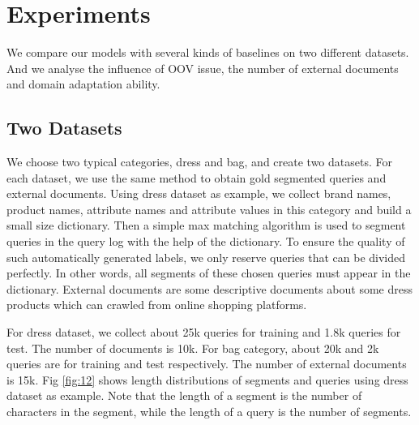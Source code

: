 \section{Experiments}
\label{sec:exp}
We compare our models with several kinds of baselines on two different datasets. And we analyse the influence of OOV issue, the number of external documents and domain adaptation ability.

\subsection{Two Datasets}

We choose two typical categories, dress and bag, and create two datasets. For each dataset, we use the same method to obtain gold segmented queries and external documents. Using dress dataset as example, we collect brand names, product names, attribute names and attribute values in this category and build a small size dictionary. Then a simple max matching algorithm is used to segment queries in the query log with the help of the dictionary. To ensure the quality of such automatically generated labels, we only reserve queries that can be divided perfectly. In other words, all segments of these chosen queries must appear in the dictionary. External documents are some descriptive documents about some dress products which can crawled from online shopping platforms.

For dress dataset, we collect about 25k queries for training and 1.8k queries for test. The number of documents is 10k. For bag category, about 20k and 2k queries are for training and test respectively. The number of external documents is 15k. Fig \ref{fig:12} shows length distributions of segments and queries using dress dataset as example. Note that the length of a segment is the number of characters in the segment, while the length of a query is the number of segments.


